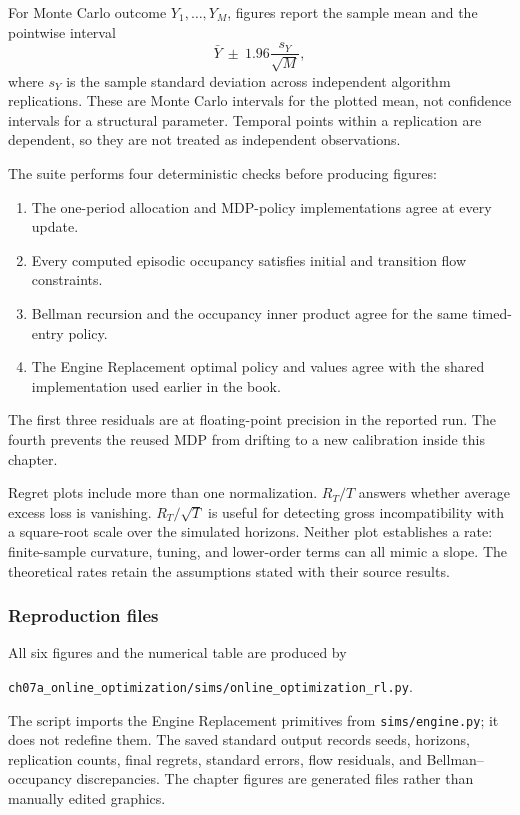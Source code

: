 For Monte Carlo outcome $Y_1,\ldots,Y_M$, figures report the sample mean and the pointwise interval
\begin{equation}
\bar Y\ \pm\ 1.96\frac{s_Y}{\sqrt M},
\label{eq:online_monte_carlo_interval}
\end{equation}
where $s_Y$ is the sample standard deviation across independent algorithm replications. These are Monte Carlo intervals for the plotted mean, not confidence intervals for a structural parameter. Temporal points within a replication are dependent, so they are not treated as independent observations.

The suite performs four deterministic checks before producing figures:
\begin{enumerate}
\item The one-period allocation and MDP-policy implementations agree at every update.
\item Every computed episodic occupancy satisfies initial and transition flow constraints.
\item Bellman recursion and the occupancy inner product agree for the same timed-entry policy.
\item The Engine Replacement optimal policy and values agree with the shared implementation used earlier in the book.
\end{enumerate}
The first three residuals are at floating-point precision in the reported run. The fourth prevents the reused MDP from drifting to a new calibration inside this chapter.

Regret plots include more than one normalization. $R_T/T$ answers whether average excess loss is vanishing. $R_T/\sqrt T$ is useful for detecting gross incompatibility with a square-root scale over the simulated horizons. Neither plot establishes a rate: finite-sample curvature, tuning, and lower-order terms can all mimic a slope. The theoretical rates retain the assumptions stated with their source results.

\subsubsection{Reproduction files}

All six figures and the numerical table are produced by
\begin{center}
\texttt{ch07a\_online\_optimization/sims/online\_optimization\_rl.py}.
\end{center}
The script imports the Engine Replacement primitives from \texttt{sims/engine.py}; it does not redefine them. The saved standard output records seeds, horizons, replication counts, final regrets, standard errors, flow residuals, and Bellman--occupancy discrepancies. The chapter figures are generated files rather than manually edited graphics.

